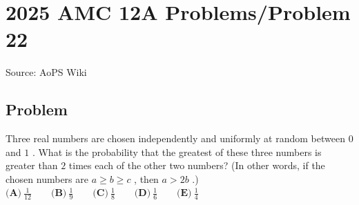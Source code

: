\documentclass[12pt]{article}
\begin{document}
\section*{{2025 AMC 12A Problems/Problem 22}}
Source: AoPS Wiki

\subsection*{Problem}
Three real numbers are chosen independently and uniformly at random between $0$ and $1$ . What is the probability that the greatest of these three numbers is greater than $2$ times each of the other two numbers? (In other words, if the chosen numbers are $a \geq b \geq c$ , then $a > 2b$ .) $\textbf{(A)}~\frac{1}{12}\qquad\textbf{(B)}~\frac19\qquad\textbf{(C)}~\frac18\qquad\textbf{(D)}~\frac16\qquad\textbf{(E)}~\frac14$
\end{document}

